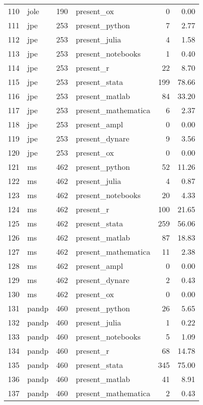 \begin{table}[ht]
\begin{tabular}{rlrlrr}
  110 & jole & 190 & present\_ox &   0 & 0.00 \\ 
  111 & jpe & 253 & present\_python &   7 & 2.77 \\ 
  112 & jpe & 253 & present\_julia &   4 & 1.58 \\ 
  113 & jpe & 253 & present\_notebooks &   1 & 0.40 \\ 
  114 & jpe & 253 & present\_r &  22 & 8.70 \\ 
  115 & jpe & 253 & present\_stata & 199 & 78.66 \\ 
  116 & jpe & 253 & present\_matlab &  84 & 33.20 \\ 
  117 & jpe & 253 & present\_mathematica &   6 & 2.37 \\ 
  118 & jpe & 253 & present\_ampl &   0 & 0.00 \\ 
  119 & jpe & 253 & present\_dynare &   9 & 3.56 \\ 
  120 & jpe & 253 & present\_ox &   0 & 0.00 \\ 
  121 & ms & 462 & present\_python &  52 & 11.26 \\ 
  122 & ms & 462 & present\_julia &   4 & 0.87 \\ 
  123 & ms & 462 & present\_notebooks &  20 & 4.33 \\ 
  124 & ms & 462 & present\_r & 100 & 21.65 \\ 
  125 & ms & 462 & present\_stata & 259 & 56.06 \\ 
  126 & ms & 462 & present\_matlab &  87 & 18.83 \\ 
  127 & ms & 462 & present\_mathematica &  11 & 2.38 \\ 
  128 & ms & 462 & present\_ampl &   0 & 0.00 \\ 
  129 & ms & 462 & present\_dynare &   2 & 0.43 \\ 
  130 & ms & 462 & present\_ox &   0 & 0.00 \\ 
  131 & pandp & 460 & present\_python &  26 & 5.65 \\ 
  132 & pandp & 460 & present\_julia &   1 & 0.22 \\ 
  133 & pandp & 460 & present\_notebooks &   5 & 1.09 \\ 
  134 & pandp & 460 & present\_r &  68 & 14.78 \\ 
  135 & pandp & 460 & present\_stata & 345 & 75.00 \\ 
  136 & pandp & 460 & present\_matlab &  41 & 8.91 \\ 
  137 & pandp & 460 & present\_mathematica &   2 & 0.43 \\ 

\end{tabular}
\end{table}
